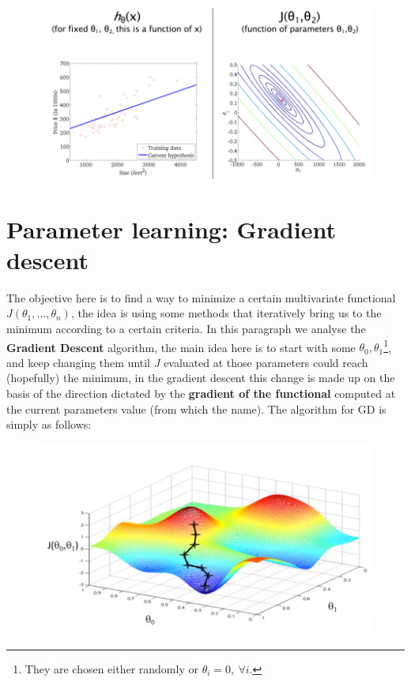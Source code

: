 \begin{figure}[h]
    \centering
    \includegraphics[scale=0.7]{img/contour.png}
\end{figure}

\section{Parameter learning: Gradient descent}
The objective here is to find a way to minimize a certain multivariate functional $J(\theta_1,..., \theta_n)$, the idea is using some methods that iteratively bring us to the minimum according to a certain criteria. In this paragraph we analyse the \textbf{Gradient Descent} algorithm, the main idea here is to start with some $\theta_0, \theta_1$\footnote{
    They are chosen either randomly or $\theta_i=0, \ \forall i$.
}, and keep changing them until $J$ evaluated at those parameters could reach (hopefully) the minimum, in the gradient descent this change is made up on the basis of the direction dictated by the \textbf{gradient of the functional} computed at the current parameters value (from which the name). The algorithm for GD is simply as follows:

\begin{figure}[h]
    \centering
    \includegraphics[scale=0.5]{img/nocvx_surf.png} 
\end{figure}

